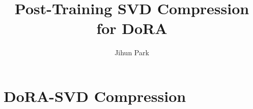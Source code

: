\documentclass[dvipdfmx,cjk,t,10pt]{beamer}
\begin{document}
\title{Post-Training SVD Compression for DoRA}
\author[shortname]{Jihun Park}

\begin{frame}
\titlepage
\end{frame}

\section{DoRA-SVD Compression}

\end{document}
